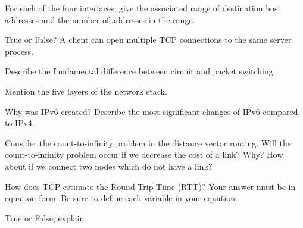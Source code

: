 \documentclass[answers,addpoints]{exam}
\begin{document}
\begin{questions}
For each of the four interfaces, give the associated range of destination host addresses and the number of addresses in the range.
\fillwithdottedlines{2in}


\question 
True or False? A client can open multiple TCP connections to the same server process. 
\fillwithdottedlines{0.5in}

\question 
Describe the fundamental difference between circuit and packet switching.
\fillwithdottedlines{1in}

\question 
Mention the five layers of the network stack. 
\fillwithdottedlines{1in}

\question 
Why was IPv6 created? Describe the most significant changes of IPv6 compared to IPv4.
\fillwithdottedlines{1in}

\question 
Consider the count-to-infinity problem in the distance vector routing. Will the count-to-infinity problem occur if we decrease the cost of a link? Why? How about if we connect two nodes which do not have a link?
\fillwithdottedlines{1in}

\question 
How does TCP estimate the Round-Trip Time (RTT)? Your answer must be in equation form. Be sure to define each variable in your equation. 
\fillwithdottedlines{0.5in}


\question 
True or False, explain
\end{questions}
\end{document}

